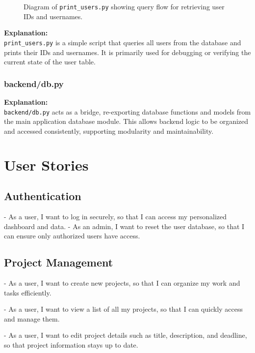 \documentclass{report}
\begin{document}
\begin{figure}[ht]
    \caption{Diagram of \texttt{print\_users.py} showing query flow for retrieving user IDs and usernames.}
\end{figure}

\noindent
\textbf{Explanation:} \\
\texttt{print\_users.py} is a simple script that queries all users from the database and prints their IDs and usernames. It is primarily used for debugging or verifying the current state of the user table.

\subsection{backend/db.py}


\noindent
\textbf{Explanation:} \\
\texttt{backend/db.py} acts as a bridge, re-exporting database functions and models from the main application database module. This allows backend logic to be organized and accessed consistently, supporting modularity and maintainability.

\chapter{User Stories}
\section{Authentication}

- As a user, I want to log in securely, so that I can access my personalized dashboard and data.
- As an admin, I want to reset the user database, so that I can ensure only authorized users have access.

\section{Project Management}
- As a user, I want to create new projects, so that I can organize my work and tasks efficiently.

- As a user, I want to view a list of all my projects, so that I can quickly access and manage them.

- As a user, I want to edit project details such as title, description, and deadline, so that project information stays up to date.
\end{document}

